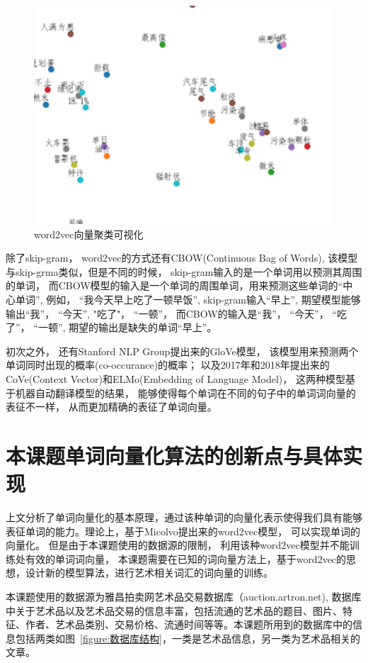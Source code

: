 \begin{figure}[htbp]
    \centering  %
    \includegraphics[width = .55\linewidth]{data/chapter-1-1/tsne.png} %
    \caption{word2vec向量聚类可视化} %
    \label{img:tsne} %
\end{figure}

除了skip-gram， word2vec的方式还有CBOW(Continuous Bag of Words), 该模型与skip-grma类似，但是不同的时候， skip-gram输入的是一个单词用以预测其周围的单词， 而CBOW模型的输入是一个单词的周围单词，用来预测这些单词的“中心单词”, 例如， “我今天早上吃了一顿早饭”, skip-gram输入“早上”, 期望模型能够输出“我”， “今天”, "吃了"， “一顿”， 而CBOW的输入是“我”， “今天”， “吃了”， “一顿”, 期望的输出是缺失的单词“早上”。 

初次之外， 还有Stanford NLP Group提出来的GloVe模型， 该模型用来预测两个单词同时出现的概率(co-occurance)的概率； 以及2017年和2018年提出来的CoVe(Context Vector)和ELMo(Embedding of Language Model)， 这两种模型基于机器自动翻译模型的结果， 能够使得每个单词在不同的句子中的单词词向量的表征不一样， 从而更加精确的表征了单词向量。 

\section{本课题单词向量化算法的创新点与具体实现}

上文分析了单词向量化的基本原理，通过该种单词的向量化表示使得我们具有能够表征单词的能力。理论上，基于Micolvo提出来的word2vec模型， 可以实现单词的向量化。 但是由于本课题使用的数据源的限制， 利用该种word2vec模型并不能训练处有效的单词词向量， 本课题需要在已知的词向量方法上，基于word2vec的思想，设计新的模型算法，进行艺术相关词汇的词向量的训练。 

本课题使用的数据源为雅昌拍卖网艺术品交易数据库（auction.artron.net), 数据库中关于艺术品以及艺术品交易的信息丰富，包括流通的艺术品的题目、图片、特征、作者、艺术品类别、交易价格、流通时间等等。本课题所用到的数据库中的信息包括两类如图~\ref{figure:数据库结构}，一类是艺术品信息，另一类为艺术品相关的文章。

